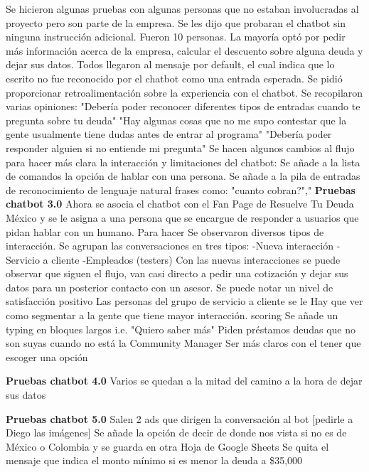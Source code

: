 Se hicieron algunas pruebas con algunas personas que no estaban involucradas al proyecto pero son parte de la empresa.
Se les dijo que probaran el chatbot sin ninguna instrucción adicional. 
Fueron 10 personas. La mayoría optó por pedir más información acerca de la empresa, calcular el descuento sobre alguna deuda y dejar sus datos. 
Todos llegaron al mensaje por default, el cual indica que lo escrito no fue reconocido por el chatbot como una entrada esperada.
Se pidió proporcionar retroalimentación sobre la experiencia con el chatbot. Se recopilaron varias opiniones:
"Debería poder reconocer diferentes tipos de entradas cuando te pregunta sobre tu deuda"
"Hay algunas cosas que no me supo contestar que la gente usualmente tiene dudas antes de entrar al programa"
"Debería poder responder alguien si no entiende mi pregunta"
Se hacen algunos cambios al flujo para hacer más clara la interacción y limitaciones del chatbot:
Se añade a la lista de comandos la opción de hablar con una persona.
Se añade a la pila de entradas de reconocimiento de lenguaje natural frases como: "cuanto cobran?","
\medskip
\textbf{Pruebas chatbot 3.0}
Ahora se asocia el chatbot con el Fan Page de Resuelve Tu Deuda México y se le asigna a una persona que se encargue de responder a usuarios que pidan hablar con un humano.
Para hacer
Se observaron diversos tipos de interacción. Se agrupan las conversaciones en tres tipos:
-Nueva interacción
-Servicio a cliente
-Empleados (testers)
Con las nuevas interacciones se puede observar que siguen el flujo, van casi directo a pedir una cotización y dejar sus datos para un posterior contacto con un asesor. Se puede notar un nivel de satisfacción positivo
Las personas del grupo de servicio a cliente se le 
Hay que ver como segmentar a la gente que tiene mayor interacción. scoring
Se añade un typing en bloques largos i.e. "Quiero saber más"
Piden préstamos
deudas que no son suyas
cuando no está la Community Manager
Ser más claros con el tener que escoger una opción

\medskip
\textbf{Pruebas chatbot 4.0}
Varios se quedan a la mitad del camino a la hora de dejar sus datos

\medskip
\textbf{Pruebas chatbot 5.0}
Salen 2 ads que dirigen la conversación al bot [pedirle a Diego las imágenes]
Se añade la opción de decir de donde nos vista si no es de México o Colombia y se guarda en otra Hoja de Google Sheets
Se quita el mensaje que indica el monto mínimo si es menor la deuda a \$35,000
